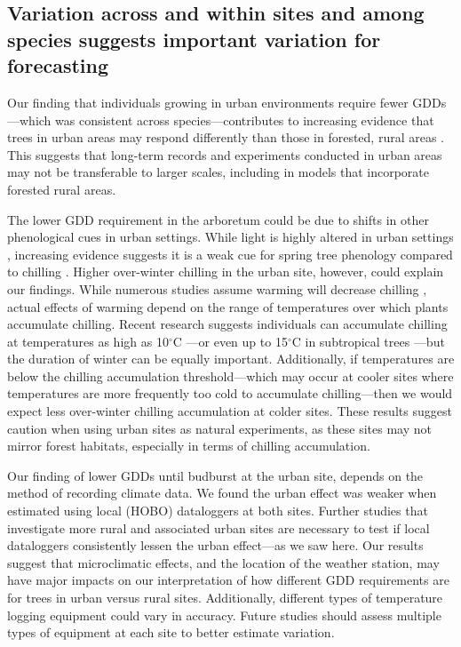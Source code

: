 \documentclass{article}\usepackage[]{graphicx}\usepackage[]{color}
\newcommand{\R}[1]{\label{#1}\linelabel{#1}}
\begin{document}
\subsection{Variation across and within sites and among species suggests important variation for forecasting} 
Our finding that individuals growing in urban environments require fewer GDDs---which was consistent across species---contributes to increasing evidence that trees in urban areas may respond differently than those in forested, rural areas \citep{Meng2020}. This suggests that long-term records and experiments conducted in urban areas may not be transferable to larger scales, including in models that incorporate forested rural areas. 

\R{Z2chillstart}The lower GDD requirement in the arboretum could be due to shifts in other phenological cues in urban settings. While light is highly altered in urban settings \citep{Jochner2015}, increasing evidence suggests it is a weak cue for spring tree phenology compared to chilling \citep{Ettinger2020}. Higher over-winter chilling in the urban site, however, could explain our findings. While numerous studies assume warming will decrease chilling \citep{Luedeling2011,Fu2015,Asse2018}, actual effects of warming depend on the range of temperatures over which plants accumulate chilling. Recent research suggests individuals can accumulate chilling at temperatures as high as 10$^{\circ}$C \citep{Baumgarten2021}---or even up to 15$^{\circ}$C in subtropical trees \citep{Zhang2021}---but the duration of winter can be equally important. Additionally, if temperatures are below the chilling accumulation threshold---which may occur at cooler sites where temperatures are more frequently too cold to accumulate chilling---then we would expect less over-winter chilling accumulation at colder sites. These results suggest caution when using urban sites as natural experiments, as these sites may not mirror forest habitats, especially in terms of chilling accumulation. \R{Z2chillend}

Our finding of lower GDDs until budburst at the urban site, depends on the method of recording climate data. We found the urban effect was weaker when estimated using local (HOBO) dataloggers at both sites. Further studies that investigate more rural and associated urban sites are necessary to test if local dataloggers consistently lessen the urban effect---as we saw here. Our results suggest that microclimatic effects, and the location of the weather station, may have major impacts on our interpretation of how different GDD requirements are for trees in urban versus rural sites. Additionally, different types of temperature logging equipment could vary in accuracy. Future studies should assess multiple types of equipment at each site to better estimate variation. 
\end{document}
